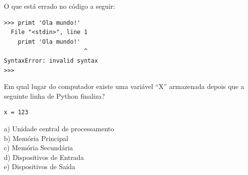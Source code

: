 \begin{ex}
O que está errado no código a seguir:

\beforeverb
\begin{verbatim}
>>> primt 'Ola mundo!'
  File "<stdin>", line 1
    primt 'Ola mundo!'
                       ^
SyntaxError: invalid syntax
>>>
\end{verbatim}
\afterverb

\end{ex}
%
%
%

\begin{ex}
Em qual lugar do computador existe uma variável ``X'' armazenada
depois que a seguinte linha de Python finaliza?

\beforeverb
\begin{verbatim}
x = 123
\end{verbatim}
\afterverb
%
a) Unidade central de processamento\\
b) Memória Principal\\
c) Memória Secundária\\
d) Dispositivos de Entrada\\
e) Dispositivos de Saída
\end{ex}
%
%

